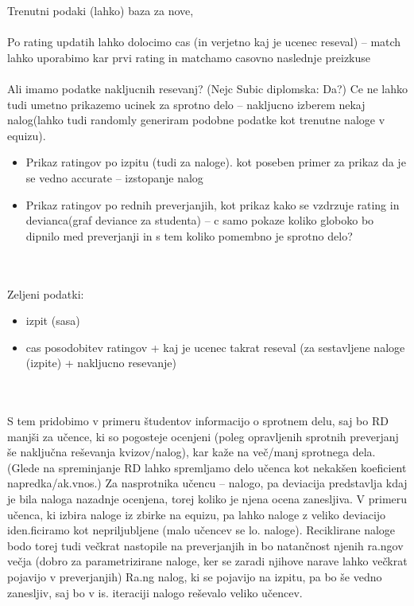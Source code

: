 \documentclass{IEEEtran}
\begin{document}
Trenutni podaki (lahko) baza za nove,
\\
\\
Po rating updatih lahko dolocimo cas (in verjetno kaj je ucenec reseval) -- match lahko uporabimo kar prvi rating in matchamo casovno naslednje preizkuse
\\
\\
Ali imamo podatke nakljucnih resevanj? (Nejc Subic diplomska: Da?)
Ce ne lahko tudi umetno prikazemo ucinek za sprotno delo -- nakljucno izberem nekaj nalog(lahko tudi randomly generiram podobne podatke kot trenutne naloge v equizu).
\\
\begin{itemize}
    \item Prikaz ratingov po izpitu (tudi za naloge). kot poseben primer za prikaz da je se vedno accurate -- izstopanje nalog
    \item Prikaz ratingov po rednih preverjanjih, kot prikaz kako se vzdrzuje rating in devianca(graf deviance za studenta) -- c samo pokaze koliko globoko bo dipnilo med preverjanji in s tem koliko pomembno je sprotno delo?
\end{itemize}
\hfill
\\
\\
Zeljeni podatki:
\begin{itemize}
    \item izpit (sasa)
    \item cas posodobitev ratingov + kaj je ucenec takrat reseval (za sestavljene naloge (izpite) + nakljucno resevanje)
\end{itemize}
\hfill
\\
\\
S tem pridobimo v primeru študentov informacijo o sprotnem delu, saj bo RD manjši za učence, ki so pogosteje ocenjeni (poleg opravljenih sprotnih preverjanj še naključna reševanja kvizov/nalog), kar kaže na več/manj sprotnega dela.
(Glede na spreminjanje RD lahko spremljamo delo učenca kot nekakšen koeficient napredka/ak.vnos.)
Za nasprotnika učencu – nalogo, pa deviacija predstavlja kdaj je bila naloga nazadnje ocenjena, torej koliko je njena ocena zanesljiva. V primeru učenca, ki izbira naloge iz zbirke na equizu, pa lahko naloge z veliko deviacijo iden.ficiramo kot nepriljubljene (malo učencev se lo. naloge).
Reciklirane naloge bodo torej tudi večkrat nastopile na preverjanjih in bo natančnost njenih ra.ngov večja (dobro za parametrizirane naloge, ker se zaradi njihove narave lahko večkrat pojavijo v preverjanjih)
Ra.ng nalog, ki se pojavijo na izpitu, pa bo še vedno zanesljiv, saj bo v is. iteraciji nalogo reševalo veliko učencev.
\end{document}
